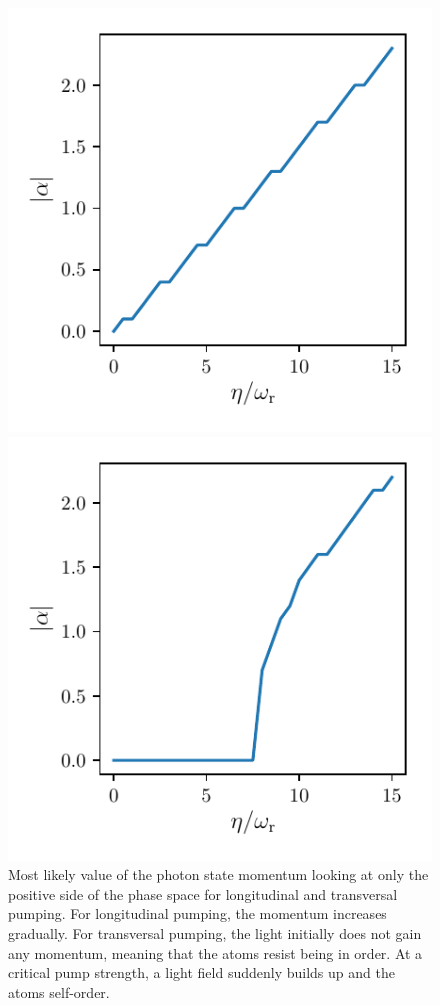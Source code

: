 \begin{figure}[!htb]
	\begin{minipage}[b]{.5\linewidth}
	\centering
	\includegraphics[width=.9\textwidth]{images/theta_long.pdf}
	\end{minipage}
%
	\begin{minipage}[b]{.5\linewidth}
	\centering
	\includegraphics[width=.9\textwidth]{images/theta_trans.pdf}
	\end{minipage}
\caption{Most likely value of the photon state momentum looking at only the positive side of the phase space for longitudinal and transversal pumping. For longitudinal pumping, the momentum increases gradually. For transversal pumping, the light initially does not gain any momentum, meaning that the atoms resist being in order. At a critical pump strength, a light field suddenly builds up and the atoms self-order.}
\label{fig_order_param}
\end{figure}
\FloatBarrier

